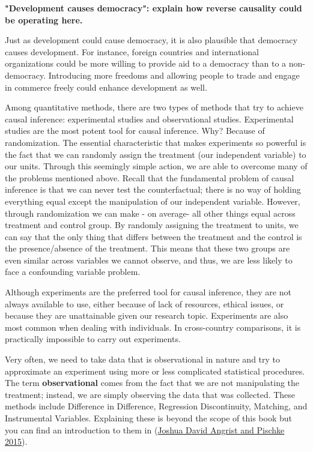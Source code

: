 \documentclass{book}
\newenvironment{shaded*}{
    \begin{center}
    \begin{tabular}{|p{0.9\textwidth}|}
    \hline\\
    }
    { 
    \\\\\hline
    \end{tabular} 
    \end{center}
}
\begin{document}
\textbf{"Development causes democracy": explain how reverse causality could be operating here.}

\begin{shaded*}

Just as development could cause democracy, it is also plausible that democracy
causes development. For instance, foreign countries and international
organizations could be more willing to provide aid to a democracy than to a
non-democracy. Introducing more freedoms and allowing people to trade and
engage in commerce freely could enhance development as well.

\end{shaded*}

Among quantitative methods, there are two types of methods that try to achieve
causal inference: experimental studies and observational studies. Experimental
studies are the most potent tool for causal inference. Why? Because of
randomization. The essential characteristic that makes experiments so powerful
is the fact that we can randomly assign the treatment (our independent
variable) to our units. Through this seemingly simple action, we are able to
overcome many of the problems mentioned above. Recall that the fundamental
problem of causal inference is that we can never test the counterfactual;
there is no way of holding everything equal except the manipulation of our
independent variable. However, through randomization we can make - on average-
all other things equal across treatment and control group. By randomly
assigning the treatment to units, we can say that the only thing that differs
between the treatment and the control is the presence/absence of the
treatment. This means that these two groups are even similar across variables
we cannot observe, and thus, we are less likely to face a confounding variable
problem.

Although experiments are the preferred tool for causal inference, they are not
always available to use, either because of lack of resources, ethical issues,
or because they are unattainable given our research topic. Experiments are
also most common when dealing with individuals. In cross-country comparisons,
it is practically impossible to carry out experiments.

Very often, we need to take data that is observational in nature and try to
approximate an experiment using more or less complicated statistical
procedures. The term \textbf{observational} comes from the fact that we are
not manipulating the treatment; instead, we are simply observing the data that
was collected. These methods include Difference in Difference, Regression
Discontinuity, Matching, and Instrumental Variables. Explaining these is
beyond the scope of this book but you can find an introduction to them in
(\protect\hyperlink{ref-angristMasteringMetricsPath2015}{Joshua David Angrist
and Pischke 2015}).
\end{document}
